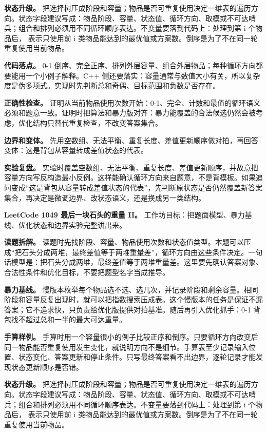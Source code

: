 \textbf{状态升级。} 把选择树压成阶段和容量；物品是否可重复使用决定一维表的遍历方向。状态字段建议写成：物品阶段、容量、状态值、循环方向、取模或不可达哨兵；组合和排列必须用不同循环顺序表达。不变量要落到代码上：处理到第 i 个物品后， 表示只使用前 i 类物品能达到的最优值或方案数。倒序是为了不在同一轮重复使用当前物品。

\textbf{代码落点。} 0-1 倒序、完全正序、排列外层容量、组合外层物品；每种循环方向都要能用一个小例子解释。C++ 侧还要落实：容量通常与数值大小有关，所以复杂度是伪多项式。实现时先判断总和奇偶、目标范围和负数是否存在。

\textbf{正确性检查。} 证明从当前物品使用次数开始：0-1、完全、计数和最值的循环语义必须和题意一致。证明时把算法和暴力版对齐：暴力能覆盖的合法候选仍然会被考虑，优化结构只替代重复检查，不改变答案集合。

\textbf{边界和变体。} 先用空数组、无法平衡、重复长度、差值更新顺序做对拍，再回答变体：这是背包从容量转成差值状态的代表。

\textbf{实验复盘。} 实验时覆盖空数组、无法平衡、重复长度、差值更新顺序，并故意把容量方向写反构造最小反例。这样能确认循环方向来自题意，不是背模板。如果追问变成“这是背包从容量转成差值状态的代表”，先判断原状态是否仍然覆盖新答案集合，再决定是微调边界、改状态语义，还是换成另一类结构。

\noindent\textbf{LeetCode 1049 最后一块石头的重量 II。} 工作坊目标：把题面模型、暴力基线、优化状态和边界实验完整讲出来。

\textbf{读题拆解。} 读题时先找阶段、容量、物品使用次数和状态值类型。本题可以压成“把石头分成两堆，最终差值等于两堆重量差”，循环方向由这些条件决定。一句话模型是：把石头分成两堆，最终差值等于两堆重量差。这里要先确认答案对象、合法性条件和优化目标，不要把题型名字当成推导。

\textbf{暴力基线。} 慢版本枚举每个物品选不选、选几次，并记录阶段和剩余容量。相同阶段和容量反复出现时，就可以把指数搜索压成表。这个慢版本的任务是保证不漏答案；它不追求快，只负责给优化版提供对拍基准。随后再引入优化抓手：0-1 背包找不超过总和一半的最大可达重量。

\textbf{手算样例。} 手算时用一个容量很小的例子比较正序和倒序。只要循环方向改变后同一物品能否重复使用发生变化，就说明方向不是细节。手算表至少记录输入位置、状态变化、答案更新和停止条件。只写最终答案看不出边界，逐轮记录才能发现状态更新顺序是否错。

\textbf{状态升级。} 把选择树压成阶段和容量；物品是否可重复使用决定一维表的遍历方向。状态字段建议写成：物品阶段、容量、状态值、循环方向、取模或不可达哨兵；组合和排列必须用不同循环顺序表达。不变量要落到代码上：处理到第 i 个物品后， 表示只使用前 i 类物品能达到的最优值或方案数。倒序是为了不在同一轮重复使用当前物品。

